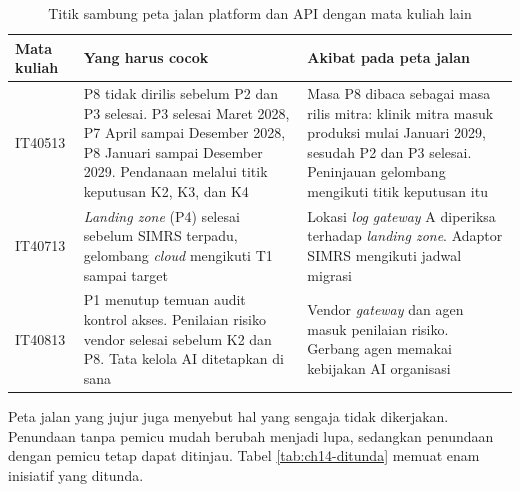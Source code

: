 \begin{table}[!htb]
  \centering
  \caption{Titik sambung peta jalan platform dan API dengan mata kuliah lain}
  \label{tab:ch14-selaras}
  \footnotesize
  \begin{tabularx}{\textwidth}{H{1.45cm}GG}
    \hline
    \textbf{Mata kuliah} & \textbf{Yang harus cocok} & \textbf{Akibat pada peta jalan} \\ \hline
    IT40513 & P8 tidak dirilis sebelum P2 dan P3 selesai. P3 selesai Maret 2028, P7 April sampai Desember 2028, P8 Januari sampai Desember 2029. Pendanaan melalui titik keputusan K2, K3, dan K4 & Masa P8 dibaca sebagai masa rilis mitra: klinik mitra masuk produksi mulai Januari 2029, sesudah P2 dan P3 selesai. Peninjauan gelombang mengikuti titik keputusan itu \\ \hline
    IT40713 & \textit{Landing zone} (P4) selesai sebelum SIMRS terpadu, gelombang \textit{cloud} mengikuti T1 sampai target & Lokasi \textit{log} \textit{gateway} A diperiksa terhadap \textit{landing zone}. Adaptor SIMRS mengikuti jadwal migrasi \\ \hline
    IT40813 & P1 menutup temuan audit kontrol akses. Penilaian risiko vendor selesai sebelum K2 dan P8. Tata kelola AI ditetapkan di sana & Vendor \textit{gateway} dan agen masuk penilaian risiko. Gerbang agen memakai kebijakan AI organisasi \\ \hline
  \end{tabularx}
\end{table}

Peta jalan yang jujur juga menyebut hal yang sengaja tidak dikerjakan. Penundaan tanpa pemicu mudah berubah menjadi lupa, sedangkan penundaan dengan pemicu tetap dapat ditinjau. Tabel \ref{tab:ch14-ditunda} memuat enam inisiatif yang ditunda.

